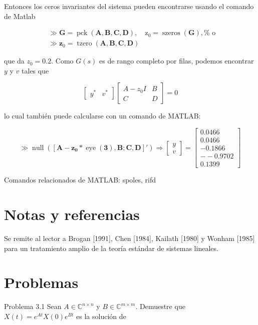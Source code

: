 Entonces los ceros invariantes del sistema pueden encontrarse usando el comando de Matlab

$$
\begin{aligned}
& \gg \mathbf{G}=\operatorname{pck}(\mathbf{A}, \mathbf{B}, \mathbf{C}, \mathbf{D}), \quad \mathrm{z}_{0}=\operatorname{szeros}(\mathbf{G}), \% \text { o } \\
& \gg \mathbf{z}_{0}=\operatorname{tzero}(\mathbf{A}, \mathbf{B}, \mathbf{C}, \mathbf{D})
\end{aligned}
$$

que da $z_{0}=0.2$. Como $G(s)$ es de rango completo por filas, podemos encontrar $y$ y $v$ tales que

$$
\left[\begin{array}{ll}
y^{*} & v^{*}
\end{array}\right]\left[\begin{array}{cc}
A-z_{0} I & B \\
C & D
\end{array}\right]=0
$$

lo cual también puede calcularse con un comando de MATLAB:

$$
\gg \operatorname{null}\left(\left[\mathbf{A}-\mathbf{z}_{\mathbf{0}} * \operatorname{eye}(\mathbf{3}), \mathbf{B} ; \mathbf{C}, \mathbf{D}\right]'\right) \Longrightarrow\left[\begin{array}{l}
y \\
v
\end{array}\right]=\left[\begin{array}{c}
0.0466 \\
0.0466 \\
-0.1866 \\
--0.9702 \\
0.1399
\end{array}\right]
$$

Comandos relacionados de MATLAB: spoles, rifd

\section{Notas y referencias}
Se remite al lector a Brogan [1991], Chen [1984], Kailath [1980] y Wonham [1985] para un tratamiento amplio de la teoría estándar de sistemas lineales.

\section{Problemas}
Problema 3.1 Sean $A \in \mathbb{C}^{n \times n}$ y $B \in \mathbb{C}^{m \times m}$. Demuestre que $X(t)=e^{A t} X(0) e^{B t}$ es la solución de

